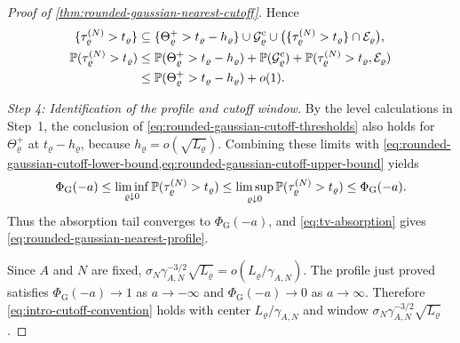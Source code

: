 \documentclass[11pt,reqno,a4paper]{article}
\newcommand{\Pp}{\P}
\begin{document}
\begin{proof}[Proof of \cref{thm:rounded-gaussian-nearest-cutoff}]
  Hence
  \begin{align}
    \{\tau_\varrho^{(N)}>t_\varrho\}
    &\subseteq
    \{\Theta_\varrho^+>t_\varrho-h_\varrho\}
    \cup\mathcal G_\varrho^{\mathrm c}
    \cup\bigl(\{\tau_\varrho^{(N)}>t_\varrho\}
      \cap\mathcal E_\varrho\bigr),
    \notag\\
    \Pp(\tau_\varrho^{(N)}>t_\varrho)
    &\leq
    \Pp(\Theta_\varrho^+>t_\varrho-h_\varrho)
    +\Pp(\mathcal G_\varrho^{\mathrm c})
    +\Pp(\tau_\varrho^{(N)}>t_\varrho,\mathcal E_\varrho)
    \notag\\
    &\leq
    \Pp(\Theta_\varrho^+>t_\varrho-h_\varrho)+o(1).
    \label{eq:rounded-gaussian-cutoff-upper-bound}
  \end{align}

  \emph{Step 4: Identification of the profile and cutoff window.}
  By the level calculations in Step~1, the conclusion of
  \cref{eq:rounded-gaussian-cutoff-thresholds} also holds for
  $\Theta_\varrho^+$ at $t_\varrho-h_\varrho$, because
  $h_\varrho=o(\sqrt{L_\varrho})$.
  Combining these limits with
  \cref{eq:rounded-gaussian-cutoff-lower-bound,eq:rounded-gaussian-cutoff-upper-bound}
  yields
  \begin{equation*}
    \Phi_{\mathrm G}(-a)
    \leq
    \liminf_{\varrho\downarrow0}
    \Pp(\tau_\varrho^{(N)}>t_\varrho)
    \leq
    \limsup_{\varrho\downarrow0}
    \Pp(\tau_\varrho^{(N)}>t_\varrho)
    \leq\Phi_{\mathrm G}(-a).
  \end{equation*}
  Thus the absorption tail converges to $\Phi_{\mathrm G}(-a)$, and
  \cref{eq:tv-absorption} gives
  \cref{eq:rounded-gaussian-nearest-profile}.

  Since $A$ and $N$ are fixed,
  $\sigma_N\gamma_{A,N}^{-3/2}\sqrt{L_\varrho}
  =o(L_\varrho/\gamma_{A,N})$. The profile just
  proved satisfies $\Phi_{\mathrm G}(-a)\to1$ as $a\to-\infty$ and
  $\Phi_{\mathrm G}(-a)\to0$ as $a\to\infty$. Therefore
  \cref{eq:intro-cutoff-convention} holds with center
  $L_\varrho/\gamma_{A,N}$ and window
  $\sigma_N\gamma_{A,N}^{-3/2}\sqrt{L_\varrho}$.
\end{proof}
\end{document}

